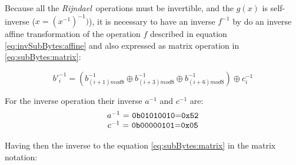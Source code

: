 \documentclass[10pt,a4paper,twoside]{llncs}
\newcommand{\rijndael}{\emph{Rijndael}}
\begin{document}
Because all the \rijndael\, operations must be invertible, and the $g(x)$ is self-inverse ($x=(x^{-1})^{-1})$), it is necessary to have an inverse $f^{-1}$ by do an inverse affine transformation of the operation $f$ described in equation \ref{eq:invSubBytes:affine} and also expressed as matrix operation in \ref{eq:subBytes:matrix}:

\begin{equation}\label{eq:invSubBytes:affine}
 b'^{-1}_{i} = (b^{-1}_{(i+1)mod8} \oplus b^{-1}_{(i+3)mod8} \oplus 
          b^{-1}_{(i+6)mod8}) \oplus c^{-1}_{i}
\end{equation}

For the inverse operation their inverse $a^{-1}$ and $c^{-1}$ are:
\begin{equation}
 \begin{tabular}{c}
  $a^{-1}$ = \texttt{0b01010010}=\texttt{0x52}\\
  $c^{-1}$ = \texttt{0b00000101}=\texttt{0x05}
 \end{tabular}
\end{equation}

Having then the inverse to the equation \ref{eq:subBytes:matrix} in the matrix notation:
\end{document}
